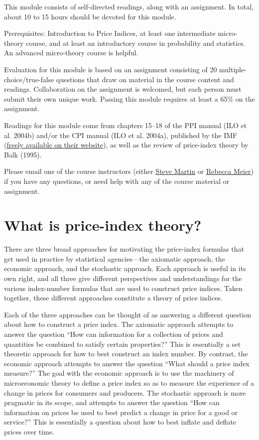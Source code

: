 \documentclass[]{article}
\begin{document}
This module consists of self-directed readings, along with an assignment. In total, about 10 to 15 hours should be devoted for this module.

Prerequisites: Introduction to Price Indices, at least one intermediate micro-theory course, and at least an introductory course in probability and statistics. An advanced micro-theory course is helpful.

Evaluation for this module is based on an assignment consisting of 20 multiple-choice/true-false questions that draw on material in the course content and readings. Collaboration on the assignment is welcomed, but each person must submit their own unique work. Passing this module requires at least a 65\% on the assignment.

Readings for this module come from chapters 15--18 of the PPI manual (ILO et al. 2004b) and/or the CPI manual (ILO et al. 2004a), published by the IMF (\href{https://www.imf.org/en/Publications/Manuals-Guides/Issues/2016/12/30/Producer-Price-Index-Manual-Theory-and-Practice-16966}{freely available on their website}), as well as the review of price-index theory by Balk (1995).

Please email one of the course instructors (either \href{mailto:steve.martin5@canada.ca}{Steve Martin} or \href{mailto:rebecca.meier@canada.ca}{Rebecca Meier}) if you have any questions, or need help with any of the course material or assignment.

\hypertarget{what-is-price-index-theory}{%
\section{What is price-index theory?}\label{what-is-price-index-theory}}

There are three broad approaches for motivating the price-index formulas that get used in practice by statistical agencies---the axiomatic approach, the economic approach, and the stochastic approach. Each approach is useful in its own right, and all three give different perspectives and understandings for the various index-number formulas that are used to construct price indices. Taken together, these different approaches constitute a theory of price indices.

Each of the three approaches can be thought of as answering a different question about how to construct a price index. The axiomatic approach attempts to answer the question ``How can information for a collection of prices and quantities be combined to satisfy certain properties?'' This is essentially a set theoretic approach for how to best construct an index number. By contrast, the economic approach attempts to answer the question ``What should a price index measure?'' The goal with the economic approach is to use the machinery of microeconomic theory to define a price index so as to measure the experience of a change in prices for consumers and producers. The stochastic approach is more pragmatic in its scope, and attempts to answer the question ``How can information on prices be used to best predict a change in price for a good or service?'' This is essentially a question about how to best inflate and deflate prices over time.
\end{document}
